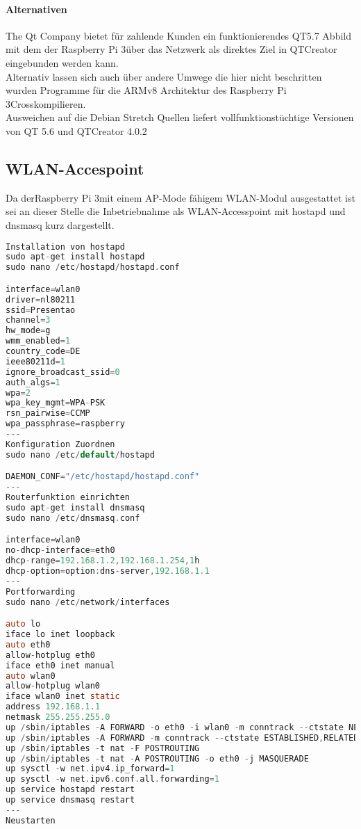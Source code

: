 \paragraph{Alternativen}$\;$\\
The Qt Company bietet für zahlende Kunden ein funktionierendes QT5.7 Abbild mit dem der \glqq Raspberry Pi 3\grqq über das Netzwerk als direktes Ziel in QTCreator eingebunden werden kann.\\
Alternativ lassen sich auch über andere Umwege die hier nicht beschritten wurden Programme für die ARMv8 Architektur des \glqq Raspberry Pi 3\grqq Crosskompilieren.\\
Ausweichen auf die Debian Stretch Quellen liefert vollfunktionstüchtige Versionen von QT 5.6 und QTCreator 4.0.2
\subsection{WLAN-Accespoint}
Da der\glqq Raspberry Pi 3\grqq mit einem AP-Mode fähigem WLAN-Modul ausgestattet ist sei an dieser Stelle die Inbetriebnahme als WLAN-Accesspoint mit hostapd und dnsmasq kurz dargestellt.
\begin{lstlisting}[frame=single,breaklines=true,basicstyle=\tiny,language=C,label={WLANCode},caption={WLAN-Accespoint}]
Installation von hostapd
sudo apt-get install hostapd
sudo nano /etc/hostapd/hostapd.conf

interface=wlan0
driver=nl80211
ssid=Presentao
channel=3
hw_mode=g
wmm_enabled=1
country_code=DE
ieee80211d=1
ignore_broadcast_ssid=0
auth_algs=1
wpa=2
wpa_key_mgmt=WPA-PSK
rsn_pairwise=CCMP
wpa_passphrase=raspberry
---
Konfiguration Zuordnen
sudo nano /etc/default/hostapd

DAEMON_CONF="/etc/hostapd/hostapd.conf"
---
Routerfunktion einrichten
sudo apt-get install dnsmasq
sudo nano /etc/dnsmasq.conf

interface=wlan0
no-dhcp-interface=eth0
dhcp-range=192.168.1.2,192.168.1.254,1h
dhcp-option=option:dns-server,192.168.1.1
---
Portforwarding
sudo nano /etc/network/interfaces

auto lo
iface lo inet loopback
auto eth0
allow-hotplug eth0
iface eth0 inet manual
auto wlan0
allow-hotplug wlan0
iface wlan0 inet static
address 192.168.1.1
netmask 255.255.255.0
up /sbin/iptables -A FORWARD -o eth0 -i wlan0 -m conntrack --ctstate NEW -j ACCEPT
up /sbin/iptables -A FORWARD -m conntrack --ctstate ESTABLISHED,RELATED -j ACCEPT
up /sbin/iptables -t nat -F POSTROUTING
up /sbin/iptables -t nat -A POSTROUTING -o eth0 -j MASQUERADE
up sysctl -w net.ipv4.ip_forward=1
up sysctl -w net.ipv6.conf.all.forwarding=1
up service hostapd restart
up service dnsmasq restart
---
Neustarten
\end{lstlisting}

